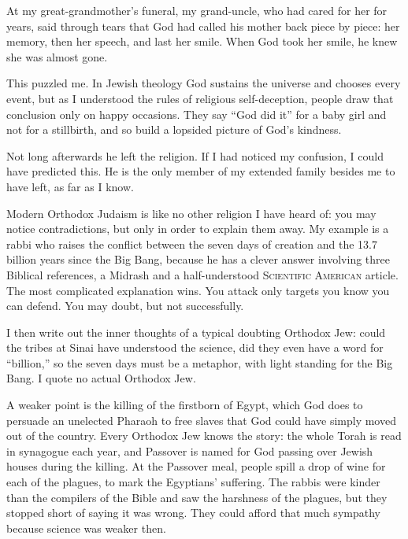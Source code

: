 
At my great-grandmother's funeral, my grand-uncle, who had cared for her for years, said through tears that God had called his mother back piece by piece: her memory, then her speech, and last her smile. When God took her smile, he knew she was almost gone.

This puzzled me. In Jewish theology God sustains the universe and chooses every event, but as I understood the rules of religious self-deception, people draw that conclusion only on happy occasions. They say ``God did it'' for a baby girl and not for a stillbirth, and so build a lopsided picture of God's kindness. 

Not long afterwards he left the religion. If I had noticed my confusion, I could have predicted this.  He is the only member of my extended family besides me to have left, as far as I know.

Modern Orthodox Judaism is like no other religion I have heard of: you may notice contradictions, but only in order to explain them away. My example is a rabbi who raises the conflict between the seven days of creation and the 13.7 billion years since the Big Bang, because he has a clever answer involving three Biblical references, a Midrash and a half-understood \textsc{Scientific American} article. The most complicated explanation wins. You attack only targets you know you can defend.  You may doubt, but not successfully. 

I then write out the inner thoughts of a typical doubting Orthodox Jew: could the tribes at Sinai have understood the science, did they even have a word for ``billion,'' so the seven days must be a metaphor, with light standing for the Big Bang. I quote no actual Orthodox Jew.

A weaker point is the killing of the firstborn of Egypt, which God does to persuade an unelected Pharaoh to free slaves that God could have simply moved out of the country. Every Orthodox Jew knows the story: the whole Torah is read in synagogue each year, and Passover is named for God passing over Jewish houses during the killing. At the Passover meal, people spill a drop of wine for each of the plagues, to mark the Egyptians' suffering. The rabbis were kinder than the compilers of the Bible and saw the harshness of the plagues, but they stopped short of saying it was wrong. They could afford that much sympathy because science was weaker then. 

